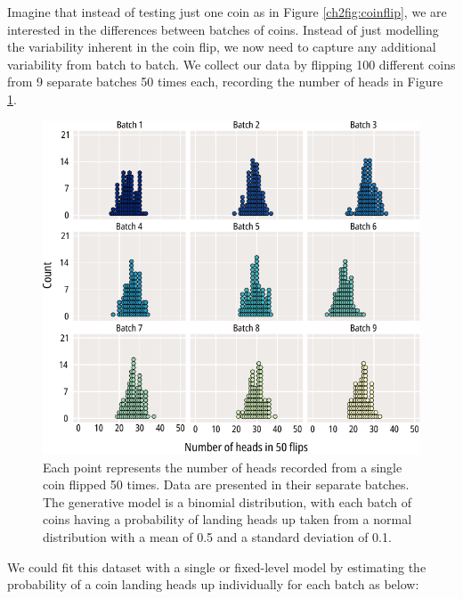 Imagine that instead of testing just one coin as in Figure \ref{ch2fig:coinflip}, we are interested in the differences between batches of coins.
Instead of just modelling the variability inherent in the coin flip, we now need to capture any additional variability from batch to batch.
We collect our data by flipping 100 different coins from 9 separate batches 50 times each, recording the number of heads in Figure \ref{ch2fig:mixed_1}.

\begin{figure}
	\centering
	\includegraphics[width=\textwidth]{coinflip_mixed_1.pdf}
	\caption[Multilevel modelling of coinflips]{
		Each point represents the number of heads recorded from a single coin flipped 50 times.
		Data are presented in their separate batches.
		The generative model is a binomial distribution, with each batch of coins having a probability of landing heads up taken from a normal distribution with a mean of 0.5 and a standard deviation of 0.1.
	}\label{ch2fig:mixed_1}
\end{figure}

We could fit this dataset with a single or fixed-level model by estimating the probability of a coin landing heads up individually for each batch as below:

